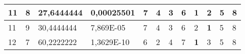 \documentclass[conference]{IEEEtran}
\begin{document}
\begin{table*}[]
\begin{tabular}{|llll|llllllll|}
\multicolumn{1}{|l|}{11}                                                    & \multicolumn{1}{l|}{8}                                                        & \multicolumn{1}{l|}{27,6444444}                                                   & 0,00025501                     & \multicolumn{1}{l|}{7}                                                  & \multicolumn{1}{l|}{4}                                                  & \multicolumn{1}{l|}{3}                                                  & \multicolumn{1}{l|}{6}                                                  & \multicolumn{1}{l|}{\textbf{1}}                                         & \multicolumn{1}{l|}{2}                                                  & \multicolumn{1}{l|}{5}                                                  & 8                          \\ \hline
\multicolumn{1}{|l|}{11}                                                    & \multicolumn{1}{l|}{9}                                                        & \multicolumn{1}{l|}{30,4444444}                                                   & 7,869E-05                      & \multicolumn{1}{l|}{7}                                                  & \multicolumn{1}{l|}{4}                                                  & \multicolumn{1}{l|}{3}                                                  & \multicolumn{1}{l|}{6}                                                  & \multicolumn{1}{l|}{2}                                                  & \multicolumn{1}{l|}{\textbf{1}}                                         & \multicolumn{1}{l|}{5}                                                  & 8                          \\ \hline
\multicolumn{1}{|l|}{12}                                                    & \multicolumn{1}{l|}{7}                                                        & \multicolumn{1}{l|}{60,2222222}                                                   & 1,3629E-10                     & \multicolumn{1}{l|}{6}                                                  & \multicolumn{1}{l|}{2}                                                  & \multicolumn{1}{l|}{4}                                                  & \multicolumn{1}{l|}{7}                                                  & \multicolumn{1}{l|}{\textbf{1}}                                         & \multicolumn{1}{l|}{3}                                                  & \multicolumn{1}{l|}{5}                                                  & 8                          \\ \hline

\end{tabular}
\end{table*}
\end{document}
